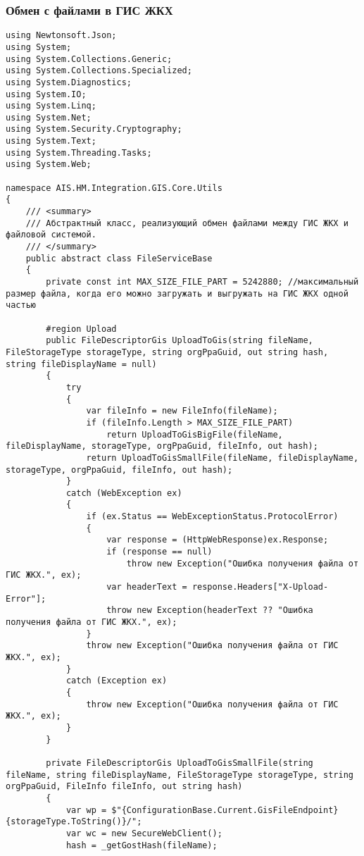 \subsubsection*{Обмен с файлами в ГИС ЖКХ}
\begin{lstlisting}
using Newtonsoft.Json;
using System;
using System.Collections.Generic;
using System.Collections.Specialized;
using System.Diagnostics;
using System.IO;
using System.Linq;
using System.Net;
using System.Security.Cryptography;
using System.Text;
using System.Threading.Tasks;
using System.Web;

namespace AIS.HM.Integration.GIS.Core.Utils
{
    /// <summary>
    /// Абстрактный класс, реализующий обмен файлами между ГИС ЖКХ и файловой системой.
    /// </summary>
    public abstract class FileServiceBase
    {
        private const int MAX_SIZE_FILE_PART = 5242880; //максимальный размер файла, когда его можно загружать и выгружать на ГИС ЖКХ одной частью

        #region Upload
        public FileDescriptorGis UploadToGis(string fileName, FileStorageType storageType, string orgPpaGuid, out string hash, string fileDisplayName = null)
        {
            try
            {
                var fileInfo = new FileInfo(fileName);
                if (fileInfo.Length > MAX_SIZE_FILE_PART)
                    return UploadToGisBigFile(fileName, fileDisplayName, storageType, orgPpaGuid, fileInfo, out hash);
                return UploadToGisSmallFile(fileName, fileDisplayName, storageType, orgPpaGuid, fileInfo, out hash);
            }
            catch (WebException ex)
            {
                if (ex.Status == WebExceptionStatus.ProtocolError)
                {
                    var response = (HttpWebResponse)ex.Response;
                    if (response == null)
                        throw new Exception("Ошибка получения файла от ГИС ЖКХ.", ex);
                    var headerText = response.Headers["X-Upload-Error"];
                    throw new Exception(headerText ?? "Ошибка получения файла от ГИС ЖКХ.", ex);
                }
                throw new Exception("Ошибка получения файла от ГИС ЖКХ.", ex);
            }
            catch (Exception ex)
            {
                throw new Exception("Ошибка получения файла от ГИС ЖКХ.", ex);
            }
        }

        private FileDescriptorGis UploadToGisSmallFile(string fileName, string fileDisplayName, FileStorageType storageType, string orgPpaGuid, FileInfo fileInfo, out string hash)
        {
            var wp = $"{ConfigurationBase.Current.GisFileEndpoint}{storageType.ToString()}/";
            var wc = new SecureWebClient();
            hash = _getGostHash(fileName);


\end{lstlisting}
